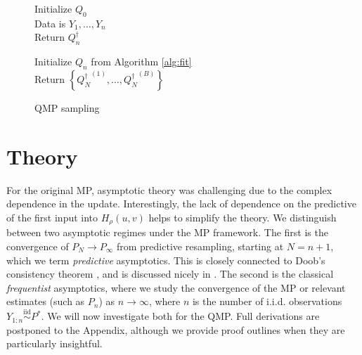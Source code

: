 \documentclass[11pt,a4paper]{article}
\newcommand{\iid}{\overset{\mathrm{iid}}{\sim}}
\begin{document}
\begin{figure}[!ht]
\small
  \centering
  \begin{minipage}{.44\linewidth}
\begin{algorithm}[H]
{Initialize $Q_0$}\\
{Data is $Y_1,\ldots,Y_n$}\\
 {Return $Q_n^{\dagger}$}
\caption{Estimation of quantile function}\label{alg:fit}
\end{algorithm}
\end{minipage}
\hspace{3mm}
\begin{minipage}{.52\linewidth}
\begin{algorithm}[H]
{Initialize $Q_n$ from {Algorithm \ref{alg:fit}}}\\
 {Return $\left\{{Q_N^{\dagger}}^{(1)},\ldots,{Q_N^{\dagger}}^{(B)}\right\}$}
\caption{QMP sampling}\label{alg:QMP}
\end{algorithm}
\end{minipage}
\end{figure}\vspace{-5mm}




\section{Theory}\label{sec:theory}

For the original MP, asymptotic theory was challenging due to the complex dependence in the update. Interestingly, the lack of dependence on the predictive of the first input into $H_\rho(u,v)$ helps to simplify the theory. We distinguish between two asymptotic regimes under the MP framework. The first is the convergence of $P_N \to P_\infty$ from predictive resampling, starting at $N = n+1$, which we term \textit{predictive} asymptotics. This is closely connected to Doob's consistency theorem \citep{Doob1949}, and is discussed nicely in \cite{Fortini2024}. The second is the classical \textit{frequentist} asymptotics, where we study the convergence of the MP or relevant estimates (such as $P_n$) as $n \to \infty$, where $n$ is the number of i.i.d. observations $Y_{1:n} \iid P^*$.  We will now investigate both for the QMP. Full derivations are postponed to the Appendix, although we provide proof outlines when they are particularly insightful. 
\end{document}
